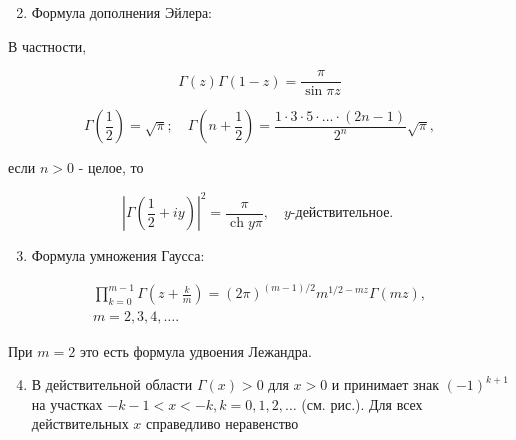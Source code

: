 \documentclass[10pt]{article}
\begin{document}
\begin{enumerate}

  \setcounter{enumi}{1}

  \item Формула дополнения Эйлера:

\end{enumerate}



В частности,



\[

\Gamma(z) \Gamma(1-z)=\frac{\pi}{\sin \pi z}

\]



\[

\Gamma\left(\frac{1}{2}\right)=\sqrt{\pi} ; \quad \Gamma\left(n+\frac{1}{2}\right)=\frac{1 \cdot 3 \cdot 5 \cdot \ldots \cdot(2 n-1)}{2^{n}} \sqrt{\pi},

\]



если $n>0$ - целое, то



\[

\left|\Gamma\left(\frac{1}{2}+i y\right)\right|^{2}=\frac{\pi}{\operatorname{ch} y \pi}, \quad y \text {-действительное. }

\]



\begin{enumerate}

  \setcounter{enumi}{2}

  \item Формула умножения Гаусса:

\end{enumerate}



\[

\begin{gathered}

\prod_{k=0}^{m-1} \Gamma\left(z+\frac{k}{m}\right)=(2 \pi)^{(m-1) / 2} m^{1 / 2-m z} \Gamma(m z), \\

m=2,3,4, \ldots .

\end{gathered}

\]



При $m=2$ это есть формула удвоения Лежандра.



\begin{enumerate}

  \setcounter{enumi}{3}

  \item В действительной области $\Gamma(x)>0$ для $x>0$ и принимает знак $(-1)^{k+1}$ на участках $-k-1<x<-k, k=0,1,2, \ldots$ (см. рис.). Для всех действительных $x$ справедливо неравенство

\end{enumerate}
\end{document}
